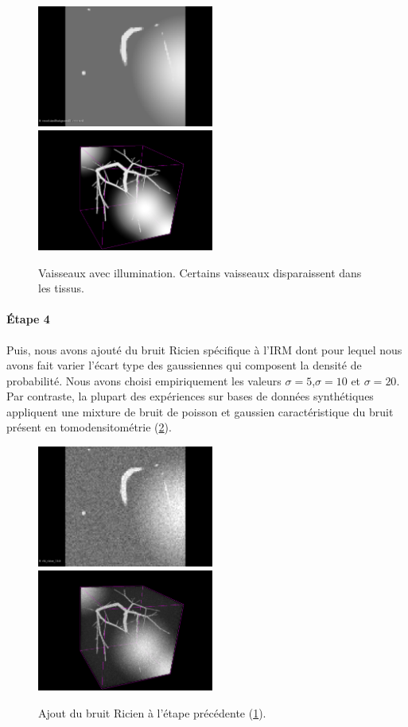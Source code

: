\begin{figure}[h]
  \centering
  \includegraphics[height=4cm]{Images/2D_VBI.png}
  \includegraphics[height=4cm]{Images/3D_VBI.png}
  \label{fig:VBI}
  \caption{Vaisseaux avec illumination. Certains vaisseaux disparaissent dans les tissus.}
\end{figure}

\paragraph{Étape 4}
Puis, nous avons ajouté du bruit Ricien spécifique à l'IRM dont pour lequel nous avons fait varier l'écart type des gaussiennes qui composent la densité de probabilité. Nous avons choisi empiriquement les valeurs $\sigma=5$,$\sigma=10$ et $\sigma=20$. Par contraste, la plupart des expériences sur bases de données synthétiques appliquent une mixture de bruit de poisson et gaussien caractéristique du bruit présent en tomodensitométrie (\ref{fig:VBIR}).

\begin{figure}[h]
  \centering
  \includegraphics[height=4cm]{Images/2D_VBIR10.png}
  \includegraphics[height=4cm]{Images/3D_VBIR10.png}
  \label{fig:VBIR}
  \caption{Ajout du bruit Ricien à l'étape précédente (\ref{fig:VBI}).}
\end{figure}


